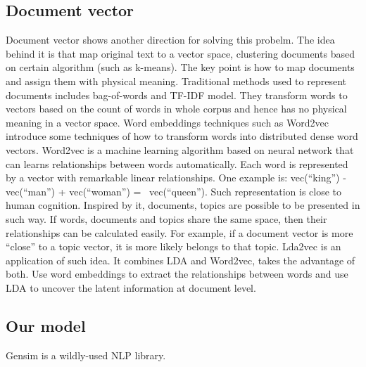 \subsection{Document vector}
\label{sec:Document vector}
Document vector shows another direction for solving this probelm. The idea behind it is that map original text to a vector space, clustering documents based on certain algorithm (such as k-means). The key point is how to map documents and assign them with physical meaning. Traditional methods used to represent documents includes bag-of-words and TF-IDF model. They transform words to vectors based on the count of words in whole corpus and hence has no physical meaning in a vector space. Word embeddings techniques such as Word2vec \cite{mikolov2013distributed,mikolov2013efficient} introduce some techniques of how to transform words into distributed dense word vectors. Word2vec is a machine learning algorithm based on neural network that can learns relationships between words automatically. Each word is represented by a vector with remarkable linear relationships. One example is: vec(“king”) - vec(“man”) + vec(“woman”) =~ vec(“queen”). Such representation is close to human cognition. Inspired by it, documents, topics are possible to be presented in such way. If words, documents and topics share the same space, then their relationships can be calculated easily. For example, if a document vector is more ``close'' to a topic vector, it is more likely belongs to that topic. Lda2vec \cite{moody2016mixing} is an application of such idea. It combines LDA and Word2vec, takes the advantage of both. Use word embeddings to extract the relationships between words and use LDA to uncover the latent information at document level. 

\subsection{Our model}
\label{sec:modelinh}

Gensim \cite{rehurek_lrec} is a wildly-used NLP library.